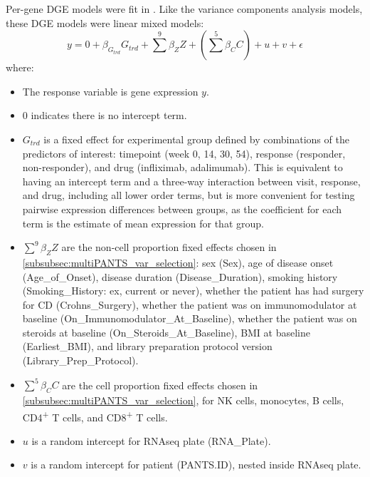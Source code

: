 Per-gene \gls{DGE} models were fit in  \autocite{hoffman2020DreamPowerfulDifferential}.
Like the variance components analysis models, these \gls{DGE} models were linear mixed models:
%
%
\begin{equation}
y = 0 + \beta_{G_{trd}} G_{trd} + \sum_{}^{9}{\beta_Z Z} + (\sum_{}^{5}{\beta_C C}) + u + v + \epsilon
\label{eq:multiPANTS_dge_model}
\end{equation}
where:
\begin{itemize}
    \item The response variable is gene expression $y$.
    \item 0 indicates there is no intercept term.
    \item $G_{trd}$ is a fixed effect for experimental group defined by combinations of the predictors of interest:
        timepoint (week 0, 14, 30, 54), 
        response (responder, non-responder), 
        and drug (infliximab, adalimumab).
        This is equivalent to having an intercept term and a three-way interaction between visit, response, and drug, including all lower order terms,
        but is more convenient for testing pairwise expression differences between groups,
        as the coefficient for each term is the estimate of mean expression for that group.
    \item $\sum_{}^{9}{\beta_Z Z}$ are the non-cell proportion fixed effects chosen in \cref{subsubsec:multiPANTS_var_selection}:
        sex (Sex), 
        age of disease onset (Age\_of\_Onset), disease duration (Disease\_Duration), 
        smoking history (Smoking\_History: ex, current or never), 
        whether the patient has had surgery for \gls{CD} (Crohns\_Surgery), 
        whether the patient was on immunomodulator at baseline (On\_Immunomodulator\_At\_Baseline), 
        whether the patient was on steroids at baseline (On\_Steroids\_At\_Baseline), 
        \gls{BMI} at baseline (Earliest\_BMI),
        and library preparation protocol version (Library\_Prep\_Protocol).
    \item $\sum_{}^{5}{\beta_C C}$ are the cell proportion fixed effects chosen in \cref{subsubsec:multiPANTS_var_selection},
        for \gls{NK} cells, monocytes, B cells, CD4\textsuperscript{+} T cells, and CD8\textsuperscript{+} T cells.
    \item $u$ is a random intercept for \gls{RNAseq} plate (RNA\_Plate).
    \item $v$ is a random intercept for patient (PANTS.ID), nested inside \gls{RNAseq} plate.
\end{itemize}

